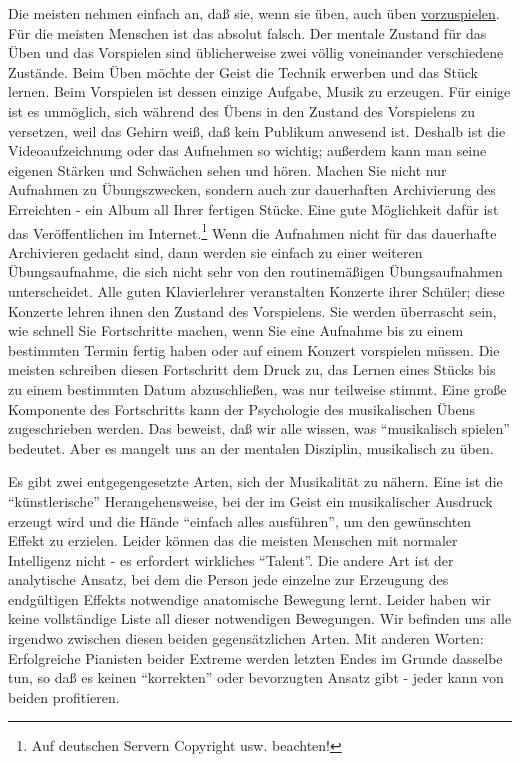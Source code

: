 Die meisten nehmen einfach an, daß sie, wenn sie üben, auch üben \hyperlink{c1iii14}{vorzuspielen}.
Für die meisten Menschen ist das absolut falsch.
Der mentale Zustand für das Üben und das Vorspielen sind üblicherweise zwei völlig voneinander verschiedene Zustände.
Beim Üben möchte der Geist die Technik erwerben und das Stück lernen.
Beim Vorspielen ist dessen einzige Aufgabe, Musik zu erzeugen.
Für einige ist es unmöglich, sich während des Übens in den Zustand des Vorspielens zu versetzen, weil das Gehirn weiß, daß kein Publikum anwesend ist.
Deshalb ist die Videoaufzeichnung oder das Aufnehmen so wichtig; außerdem kann man seine eigenen Stärken und Schwächen sehen und hören.
Machen Sie nicht nur Aufnahmen zu Übungszwecken, sondern auch zur dauerhaften Archivierung des Erreichten - ein Album all Ihrer fertigen Stücke.
Eine gute Möglichkeit dafür ist das Veröffentlichen im Internet.\footnote{Auf deutschen Servern Copyright usw. beachten!} 
Wenn die Aufnahmen nicht für das dauerhafte Archivieren gedacht sind, dann werden sie einfach zu einer weiteren Übungsaufnahme, die sich nicht sehr von den routinemäßigen Übungsaufnahmen unterscheidet.
Alle guten Klavierlehrer veranstalten Konzerte ihrer Schüler; diese Konzerte lehren ihnen den Zustand des Vorspielens.
Sie werden überrascht sein, wie schnell Sie Fortschritte machen, wenn Sie eine Aufnahme bis zu einem bestimmten Termin fertig haben oder auf einem Konzert vorspielen müssen.
Die meisten schreiben diesen Fortschritt dem Druck zu, das Lernen eines Stücks bis zu einem bestimmten Datum abzuschließen, was nur teilweise stimmt.
Eine große Komponente des Fortschritts kann der Psychologie des musikalischen Übens zugeschrieben werden.
Das beweist, daß wir alle wissen, was \enquote{musikalisch spielen} bedeutet.
Aber es mangelt uns an der mentalen Disziplin, musikalisch zu üben.

Es gibt zwei entgegengesetzte Arten, sich der Musikalität zu nähern.
Eine ist die \enquote{künstlerische} Herangehensweise, bei der im Geist ein musikalischer Ausdruck erzeugt wird und die Hände \enquote{einfach alles ausführen}, um den gewünschten Effekt zu erzielen.
Leider können das die meisten Menschen mit normaler Intelligenz nicht - es erfordert wirkliches \enquote{Talent}.
Die andere Art ist der analytische Ansatz, bei dem die Person jede einzelne zur Erzeugung des endgültigen Effekts notwendige anatomische Bewegung lernt.
Leider haben wir keine vollständige Liste all dieser notwendigen Bewegungen.
Wir befinden uns alle irgendwo zwischen diesen beiden gegensätzlichen Arten.
Mit anderen Worten: Erfolgreiche Pianisten beider Extreme werden letzten Endes im Grunde dasselbe tun, so daß es keinen \enquote{korrekten} oder bevorzugten Ansatz gibt - jeder kann von beiden profitieren.

